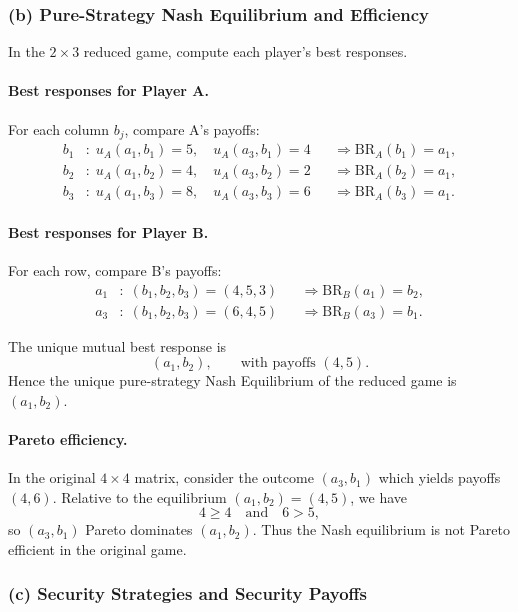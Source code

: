 \documentclass[12pt,a4paper]{article}
\begin{document}
\subsubsection*{(b) Pure-Strategy Nash Equilibrium and Efficiency}

In the \(2 \times 3\) reduced game, compute each player's best responses.

\paragraph{Best responses for Player A.}
For each column \(b_j\), compare A's payoffs:
\begin{align*}
  b_1 &: \; u_A(a_1,b_1) = 5,\quad u_A(a_3,b_1) = 4
        &&\Rightarrow \text{BR}_A(b_1) = a_1, \\
  b_2 &: \; u_A(a_1,b_2) = 4,\quad u_A(a_3,b_2) = 2
        &&\Rightarrow \text{BR}_A(b_2) = a_1, \\
  b_3 &: \; u_A(a_1,b_3) = 8,\quad u_A(a_3,b_3) = 6
        &&\Rightarrow \text{BR}_A(b_3) = a_1.
\end{align*}

\paragraph{Best responses for Player B.}
For each row, compare B's payoffs:
\begin{align*}
  a_1 &: \; (b_1,b_2,b_3) = (4,5,3)
        &&\Rightarrow \text{BR}_B(a_1) = b_2, \\
  a_3 &: \; (b_1,b_2,b_3) = (6,4,5)
        &&\Rightarrow \text{BR}_B(a_3) = b_1.
\end{align*}

The unique mutual best response is
\[
  (a_1,b_2), \qquad \text{with payoffs } (4,5).
\]
Hence the unique pure-strategy Nash Equilibrium of the reduced game is \((a_1,b_2)\).

\paragraph{Pareto efficiency.}
In the original \(4 \times 4\) matrix, consider the outcome \((a_3,b_1)\) which yields
payoffs \((4,6)\). Relative to the equilibrium \((a_1,b_2) = (4,5)\), we have
\[
  4 \ge 4 \quad \text{and} \quad 6 > 5,
\]
so \((a_3,b_1)\) Pareto dominates \((a_1,b_2)\). Thus the Nash equilibrium is not Pareto efficient
in the original game.

\subsubsection*{(c) Security Strategies and Security Payoffs}
\end{document}
